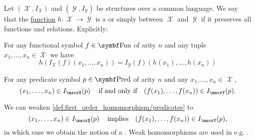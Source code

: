 \begin{definition}\label{def:first_order_homomorphism}\mcite\cite[def. 23.8]{OpenLogic20201202}
  Let \( (\mscrX, I_{\mscrX}) \) and \( (\mscrY, I_{\mscrY}) \) be structures over a common language. We say that the \hyperref[def:function]{function} \( h: \mscrX \to \mscrY \) is a  or simply  between \( \mscrX \) and \( \mscrY \) if it preserves all functions and relations. Explicitly:
  \begin{thmenum}
     For any functional symbol \( f \in \bfop{Fun} \) of arity \( n \) and any tuple \( x_1, \ldots, x_n \in \mscrX \) we have
    \begin{equation}\label{eq:def:first_order_homomorphism/functions}
      h(I_{\mscrX}(f)(x_1, \ldots, x_n)) = I_{\mscrY}(f)(h(x_1), \ldots, h(x_n))
    \end{equation}

     For any predicate symbol \( p \in \bfop{Pred} \) of arity \( n \) and any \( x_1, \ldots, x_n \in \mscrX \),
    \begin{equation}\label{eq:def:first_order_homomorphism/predicates}
      (x_1, \ldots, x_n) \in I_{\mscrX}(p) \quad\T{if and only if}\quad (f(x_1), \ldots, f(x_n)) \in I_{\mscrY}(p).
    \end{equation}

     We can weaken \ref{def:first_order_homomorphism/predicates} to
    \begin{equation}\label{eq:def:first_order_homomorphism/predicates_weak}
      (x_1, \ldots, x_n) \in I_{\mscrX}(p) \quad\T{implies}\quad (f(x_1), \ldots, f(x_n)) \in I_{\mscrY}(p),
    \end{equation}
    in which case we obtain the notion of a . Weak homomorphisms are used in e.g. .
  \end{thmenum}
\end{definition}

